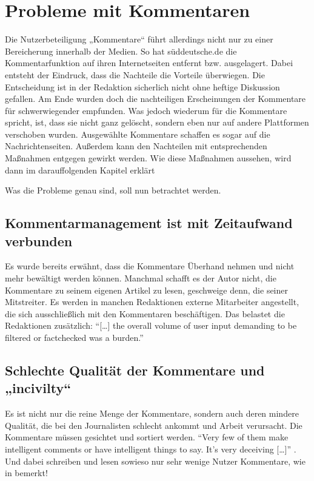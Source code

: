 \chapter{Probleme mit Kommentaren} \label{kap:probleme}

Die Nutzerbeteiligung „Kommentare“ führt allerdings nicht nur zu einer
Bereicherung innerhalb der Medien. So hat süddeutsche.de die Kommentarfunktion
auf ihren Internetseiten entfernt bzw. ausgelagert. Dabei entsteht der Eindruck,
dass die Nachteile die Vorteile überwiegen. Die Entscheidung ist in der
Redaktion sicherlich nicht ohne heftige Diskussion gefallen. Am Ende wurden doch
die nachteiligen Erscheinungen der Kommentare für schwerwiegender empfunden. Was
jedoch wiederum für die Kommentare spricht, ist, dass sie nicht ganz gelöscht,
sondern eben nur auf andere Plattformen verschoben wurden. Ausgewählte
Kommentare schaffen es sogar auf die Nachrichtenseiten. Außerdem kann den
Nachteilen mit entsprechenden Maßnahmen entgegen gewirkt werden. Wie diese
Maßnahmen aussehen, wird dann im darauffolgenden Kapitel erklärt

Was die Probleme genau sind, soll nun betrachtet werden.

\section{Kommentarmanagement ist mit Zeitaufwand verbunden}

Es wurde bereits erwähnt, dass die Kommentare Überhand nehmen und nicht mehr
bewältigt werden können. Manchmal schafft es der Autor nicht, die Kommentare zu
seinem eigenen Artikel zu lesen, geschweige denn, die seiner Mitstreiter. Es
werden in manchen Redaktionen externe Mitarbeiter angestellt, die sich
ausschließlich mit den Kommentaren beschäftigen. Das belastet die Redaktionen
zusätzlich: ``[\ldots] the overall volume of user input demanding to be filtered
or factchecked was a burden.'' \autocite[S.~172]{quandt}


\section{Schlechte Qualität der Kommentare und „incivilty“} \label{sec:schlecht}

Es ist nicht nur die reine Menge der Kommentare, sondern auch deren mindere
Qualität, die bei den Journalisten schlecht ankommt und Arbeit verursacht. Die
Kommentare müssen gesichtet und sortiert werden. ``Very few of them make
intelligent comments or have intelligent things to say. It's very deceiving
[\ldots]'' \autocite[S.~ 103]{reich}. Und dabei schreiben und lesen sowieso nur
sehr wenige Nutzer Kommentare, wie in
bemerkt!

